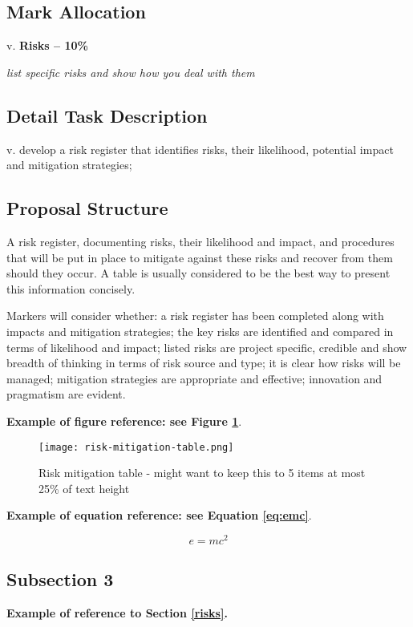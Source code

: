 \subsection{Mark Allocation}

v. \textbf{Risks -- 10\%}

\textit{list specific risks and show how you deal with them}

\subsection{Detail Task Description} 

v. develop a risk register that identifies risks, their likelihood, potential impact and mitigation strategies;

\subsection{Proposal Structure}

A risk register, documenting risks, their likelihood and impact, and procedures that will be put in place to mitigate against these risks and recover from them should they occur. A table is usually considered to be the best way to present this information concisely.

Markers will consider whether: a risk register has been completed along with impacts and mitigation strategies; the key risks are identified and compared in terms of likelihood and impact; listed risks are project specific, credible and show breadth of thinking in terms of risk source and type; it is clear how risks will be managed; mitigation strategies are appropriate and effective; innovation and pragmatism are evident.



\textbf{Example of figure reference: see Figure \ref{fig:example}}. 
\lipsum[5]

\begin{figure}[ht]
\centering\texttt{[image: risk-mitigation-table.png]}
\caption{Risk mitigation table - might want to keep this to 5 items at most ~ 25\% of text height}
\label{fig:example}
\end{figure}

\textbf{Example of equation reference: see Equation \eqref{eq:emc}}. 
\lipsum[6]

\begin{equation} 
\label{eq:emc}
e = mc^2
\end{equation}

\subsection{Subsection 3}

\textbf{Example of reference to Section \ref{risks}.} 
\lipsum[7]
\lipsum[8]